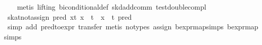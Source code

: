 \begin{isabellebody}
%
\isadelimproof
\ \ %
\endisadelimproof
%
\isatagproof
{}\isamarkupfalse%
\ {}metis\ {}lifting{}\ biconditional{}def\ skd{}add{}comm\ test{}double{}compl{}%
\endisatagproof
{\isafoldproof}%
%
\isadelimproof
\isanewline
%
\endisadelimproof
\isanewline
{}\isamarkupfalse%
\ skat{}not{}assign{}\ {}{}{}pred\ {}{}{}x{}t{}{}{}{}\ x\ {}{}\ t\ {}\ x\ {}{}\ t{}\ {}{}pred\ {}{}{}\isanewline
%
\isadelimproof
\ \ %
\endisadelimproof
%
\isatagproof
{}\isamarkupfalse%
\ {}simp\ add{}\ pred{}to{}expr{}\ transfer{}\ metis\ {}no{}types{}\ assign{}\ bexpr{}map{}simps{}{}{}\ bexpr{}map{}simps{}{}{}{}%
\endisatagproof
{\isafoldproof}%
%
\isadelimproof
\isanewline
%
\endisadelimproof
\isanewline
{}\isamarkupfalse%

\end{isabellebody}
